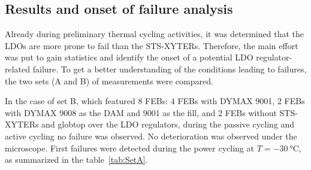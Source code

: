 \subsection{Results and onset of failure analysis}
Already during preliminary thermal cycling activities, it was determined that the \gls{LDO}s are more prone to fail than the STS-XYTERs. Therefore, the main effort was put to gain statistics and identify the onset of a potential \gls{LDO} regulator-related failure. To get a better understanding of the conditions leading to failures, the two sets (A and B) of measurements were compared. 


In the case of set B, which featured 8 \glspl{FEB}: 4 \glspl{FEB} with DYMAX 9001, 2 \glspl{FEB} with DYMAX 9008 as the DAM and 9001 as the fill, and 2 \glspl{FEB} without STS-XYTERs and globtop over the \gls{LDO} regulators, during the passive cycling and active cycling no failure was observed. No deterioration was observed under the microscope. First failures were detected during the power cycling at $T=\SI{-30}{\celsius}$, as summarized in the table~\ref{tab:SetA}. 

\begin{table}[!h]
\centering
\caption{Detailed description of the \gls{LDO} failure with regard to the type and number of cycles.}
\label{tab:SetA}
\end{table}

